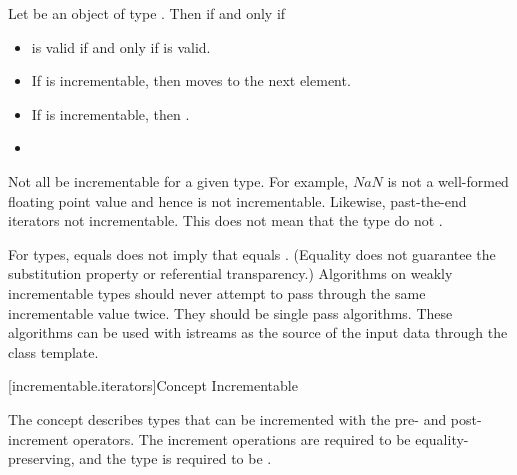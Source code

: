 \begin{addedblock}
\pnum
Let  be an object of type .  Then    if and only if

\begin{itemize}
\item {} is valid if and only if  is valid.
\item If  is incrementable, then  moves  to the next element.
\item If  is incrementable, then .
\item {}
\end{itemize}


\pnum
Not all  be incrementable for a given type.
\enternote For example, $NaN$ is not a well-formed floating point value and hence is
not incrementable. Likewise, past-the-end iterators  not
 incrementable. This does not mean that the type
do not  . \exitnote


\pnum
\enternote For  types,  equals  does not imply that 
equals . (Equality does not guarantee the substitution property or referential
transparency.) Algorithms on weakly incrementable types should never attempt to pass
through the same incrementable value twice. They should be single pass algorithms. These algorithms
can be used with istreams as the source of the input data through the  class
template.\exitnote

[incrementable.iterators]{Concept Incrementable}

\pnum
The  concept describes types that can be incremented with the pre-
and post-increment operators. The increment operations are required to be equality-preserving,
and the type is required to be . 


\end{addedblock}
